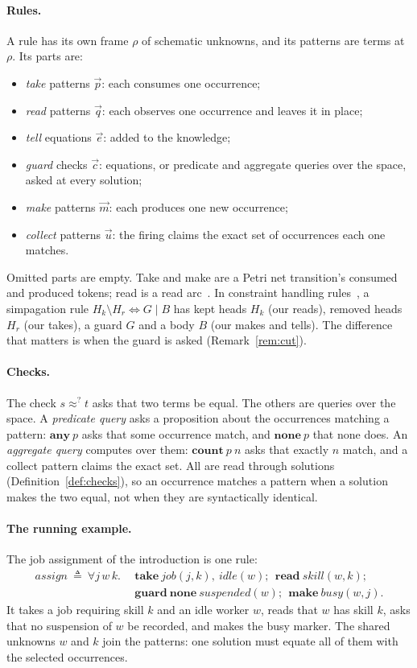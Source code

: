 \documentclass[11pt]{article}
\theoremstyle{plain}
\theoremstyle{definition}
\theoremstyle{remark}
\newcommand{\kw}[1]{\mathbf{#1}}
\begin{document}
\paragraph{Rules.} A rule has its own frame $\rho$ of schematic unknowns, and its patterns are
terms at $\rho$. Its parts are:
\begin{itemize}
\item \emph{take} patterns $\vec p$: each consumes one occurrence;
\item \emph{read} patterns $\vec q$: each observes one occurrence and leaves it in place;
\item \emph{tell} equations $\vec e$: added to the knowledge;
\item \emph{guard} checks $\vec c$: equations, or predicate and aggregate queries over the space,
  asked at every solution;
\item \emph{make} patterns $\vec m$: each produces one new occurrence;
\item \emph{collect} patterns $\vec u$: the firing claims the exact set of occurrences each one
  matches.
\end{itemize}
Omitted parts are empty. Take and make are a Petri net transition's consumed and produced
tokens; read is a read arc~\cite{montanari-rossi-contextual}. In constraint handling
rules~\cite{fruehwirth-chr}, a simpagation rule $H_k\setminus H_r\Leftrightarrow G\mid B$ has
kept heads $H_k$ (our reads), removed heads $H_r$ (our takes), a guard $G$ and a body $B$ (our
makes and tells). The difference that matters is when the guard is asked
(Remark~\ref{rem:cut}).

\paragraph{Checks.} The check $s\approx^?t$ asks that two terms be equal. The others are queries
over the space. A \emph{predicate query} asks a proposition about the occurrences matching a
pattern: $\kw{any}\ p$ asks that some occurrence match, and $\kw{none}\ p$ that none does. An
\emph{aggregate query} computes over them: $\kw{count}\ p\ n$ asks that exactly $n$ match, and a
collect pattern claims the exact set. All are read through solutions
(Definition~\ref{def:checks}), so an occurrence matches a pattern when a solution makes the two
equal, not when they are syntactically identical.

\paragraph{The running example.} The job assignment of the introduction is one rule:
\[
\begin{aligned}
\mathit{assign}\ \triangleq\ \forall j\,w\,k.\ \ &\kw{take}\ \mathit{job}(j,k),\ \mathit{idle}(w);\ \
\kw{read}\ \mathit{skill}(w,k);\\
&\kw{guard}\ \kw{none}\ \mathit{suspended}(w);\ \ \kw{make}\ \mathit{busy}(w,j).
\end{aligned}
\]
It takes a job requiring skill $k$ and an idle worker $w$, reads that $w$ has skill $k$, asks
that no suspension of $w$ be recorded, and makes the busy marker. The shared unknowns $w$ and $k$
join the patterns: one solution must equate all of them with the selected occurrences.
\end{document}
